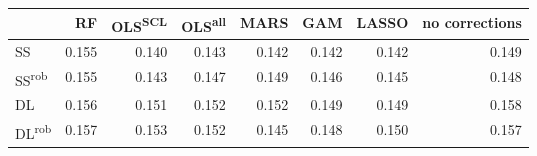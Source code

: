 \begin{tabular}{lrrrrrrr}
\toprule
 & RF & OLS\textsuperscript{SCL} & OLS\textsuperscript{all} & MARS & GAM & LASSO & no corrections \\
\midrule
SS & {\cellcolor[HTML]{282828}} \color[HTML]{F1F1F1} 0.155 & {\cellcolor[HTML]{F1F1F1}} \color[HTML]{000000} 0.140 & {\cellcolor[HTML]{C9C9C9}} \color[HTML]{000000} 0.143 & {\cellcolor[HTML]{D6D6D6}} \color[HTML]{000000} 0.142 & {\cellcolor[HTML]{D6D6D6}} \color[HTML]{000000} 0.142 & {\cellcolor[HTML]{D6D6D6}} \color[HTML]{000000} 0.142 & {\cellcolor[HTML]{797979}} \color[HTML]{F1F1F1} 0.149 \\
SS\textsuperscript{rob} & {\cellcolor[HTML]{282828}} \color[HTML]{F1F1F1} 0.155 & {\cellcolor[HTML]{C9C9C9}} \color[HTML]{000000} 0.143 & {\cellcolor[HTML]{939393}} \color[HTML]{F1F1F1} 0.147 & {\cellcolor[HTML]{797979}} \color[HTML]{F1F1F1} 0.149 & {\cellcolor[HTML]{A0A0A0}} \color[HTML]{F1F1F1} 0.146 & {\cellcolor[HTML]{AEAEAE}} \color[HTML]{000000} 0.145 & {\cellcolor[HTML]{868686}} \color[HTML]{F1F1F1} 0.148 \\
DL & {\cellcolor[HTML]{1A1A1A}} \color[HTML]{F1F1F1} 0.156 & {\cellcolor[HTML]{5D5D5D}} \color[HTML]{F1F1F1} 0.151 & {\cellcolor[HTML]{505050}} \color[HTML]{F1F1F1} 0.152 & {\cellcolor[HTML]{505050}} \color[HTML]{F1F1F1} 0.152 & {\cellcolor[HTML]{797979}} \color[HTML]{F1F1F1} 0.149 & {\cellcolor[HTML]{797979}} \color[HTML]{F1F1F1} 0.149 & {\cellcolor[HTML]{000000}} \color[HTML]{F1F1F1} 0.158 \\
DL\textsuperscript{rob} & {\cellcolor[HTML]{0D0D0D}} \color[HTML]{F1F1F1} 0.157 & {\cellcolor[HTML]{434343}} \color[HTML]{F1F1F1} 0.153 & {\cellcolor[HTML]{505050}} \color[HTML]{F1F1F1} 0.152 & {\cellcolor[HTML]{AEAEAE}} \color[HTML]{000000} 0.145 & {\cellcolor[HTML]{868686}} \color[HTML]{F1F1F1} 0.148 & {\cellcolor[HTML]{6B6B6B}} \color[HTML]{F1F1F1} 0.150 & {\cellcolor[HTML]{0D0D0D}} \color[HTML]{F1F1F1} 0.157 \\
\bottomrule
\end{tabular}
